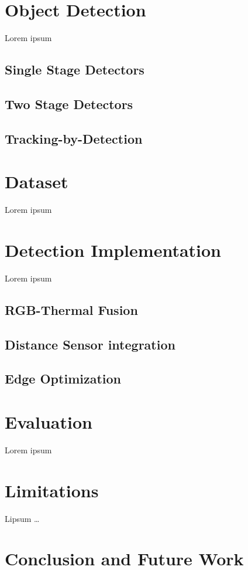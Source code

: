 \documentclass[12pt,oneside,bibtotoc,liststotoc]{scrbook}
\begin{document}
\newpage
\chapter{Object Detection}
\label{chap:object_detection}
Lorem ipsum

\section{Single Stage Detectors}

\section{Two Stage Detectors}

\section{Tracking-by-Detection}


\newpage
\chapter{Dataset}
\label{chap:dataset}
Lorem ipsum

\newpage
\chapter{Detection Implementation}
\label{chap:implementation}

Lorem ipsum

\section{RGB-Thermal Fusion}

\section{Distance Sensor integration}

\section{Edge Optimization}


\newpage
\chapter{Evaluation}
\label{chap:evaluation}
Lorem ipsum


\newpage
\chapter{Limitations}
\label{chap:limitations}
Lipsum \ldots

\newpage
\chapter{Conclusion and Future Work}
\label{chap:conclusion}

\newpage

%
%


\end{document}
